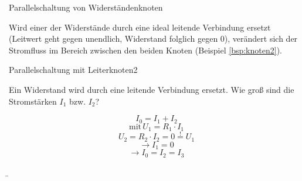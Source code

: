 \begin{frame}
{\begin{bsp}{Parallelschaltung von Widerständen}{knoten}
		
	\end{bsp}

	Wird einer der Widerstände durch eine ideal leitende Verbindung ersetzt (Leitwert geht gegen
	 unendlich, Widerstand folglich gegen 0), verändert sich der Stromfluss im Bereich
	  zwischen den beiden Knoten (Beispiel \ref{bsp:knoten2}). 



	  \begin{bsp}{Parallelschaltung mit Leiter}{knoten2}

		Ein Widerstand wird durch eine leitende Verbindung ersetzt.
		Wie groß sind die Stromstärken  $I_1$ bzw. $I_2$?\\

		\begin{center}
			

		\end{center}

		\begin{equation*}
			I_0=I_1+I_2
		\end{equation*}
		\begin{equation*}
			\mathrm{mit} \, U_1 = R_1 \cdot I_1
		\end{equation*}
		\begin{equation*}
			U_2 = R_2 \cdot I_2 =0 \stackrel{!}{=} U_1
		\end{equation*}
		\begin{equation*}
			\rightarrow I_1 = 0
		\end{equation*}
		\begin{equation*}
			\rightarrow I_0 = I_2 = I_3
		\end{equation*}



		


	  \end{bsp}	
	}
	  \b{

	\begin{columns}


\end{columns}}
\end{frame}
